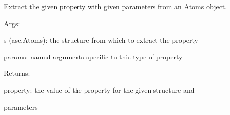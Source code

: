 \documentclass[letterpaper,10pt,english]{sphinxmanual}
\begin{document}
\begin{fulllineitems}

\begin{fulllineitems}
\label{doctree/soprano.properties.atomsproperty:soprano.properties.atomsproperty.AtomsProperty.default_params}
\end{fulllineitems}


\begin{fulllineitems}
\label{doctree/soprano.properties.atomsproperty:soprano.properties.atomsproperty.AtomsProperty.extract}
Extract the given property with given parameters from an Atoms
object.

\begin{DUlineblock}{0em}
\item[] Args:
\item[]
\begin{DUlineblock}{\DUlineblockindent}
\item[] s (ase.Atoms): the structure from which to extract the property
\item[] params: named arguments specific to this type of property
\item[] 
\end{DUlineblock}
\end{DUlineblock}

\begin{DUlineblock}{0em}
\item[] Returns:
\item[]
\begin{DUlineblock}{\DUlineblockindent}
\item[] property: the value of the property for the given structure and
\item[]
\begin{DUlineblock}{\DUlineblockindent}
\item[] parameters
\item[] 
\end{DUlineblock}
\end{DUlineblock}
\end{DUlineblock}

\end{fulllineitems}



\end{fulllineitems}
\end{document}
